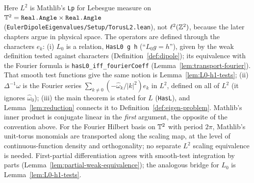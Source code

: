 \begin{remark}
Here $L^2$ is Mathlib's \texttt{Lp} for
Lebesgue measure on $\mathbb{T}^2=\texttt{Real.Angle}\times\texttt{Real.Angle}$
(\texttt{EulerDipoleEigenvalues/Setup/TorusL2.lean}), not $\ell^2(\mathbb{Z}^2)$, because the
later chapters argue in physical space. The operators are defined through
the characters $e_k$:
(i) $L_0$ is a relation, \texttt{HasL0 g h} (``$L_0g=h$''), given by the weak
definition tested against characters (Definition~\ref{def:dipole}); its
equivalence with the Fourier formula is
\texttt{hasL0\_iff\_fourierCoeff} (Lemma~\ref{lem:transport-fourier}).
That smooth test functions give the same
notion is Lemma~\ref{lem:L0-h1-tests};
(ii) $\Delta^{-1}\omega$ is the Fourier series
$\sum_{k\ne0}(-\hat\omega_k/|k|^2)e_k$ in $L^2$, defined on all of $L^2$
(it ignores $\hat\omega_0$);
(iii) the main theorem is stated for $L$ (\texttt{HasL}), and
Lemma~\ref{lem:reduction} connects it to Definition~\ref{def:eigen-problem}.
Mathlib's inner product is conjugate linear in the \emph{first} argument, the
opposite of the convention above.
For the Fourier Hilbert basis on $\mathbb{T}^2$ with period $2\pi$, Mathlib's
unit-torus monomials are transported along the scaling map, at the level of
continuous-function density and orthogonality; no separate $L^2$ scaling
equivalence is needed. First-partial differentiation agrees with smooth-test
integration by parts (Lemma~\ref{lem:partial-weak-equivalence}); the
analogous bridge for $L_0$ is Lemma~\ref{lem:L0-h1-tests}.
\end{remark}
